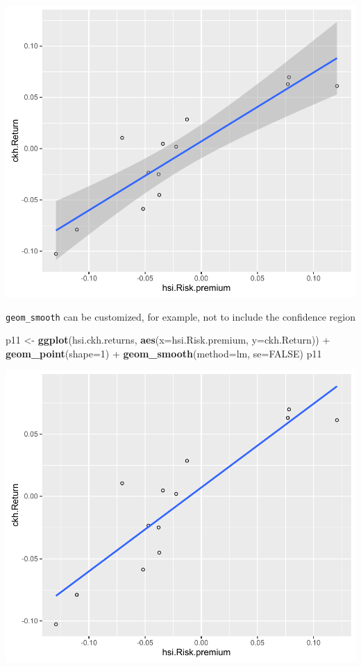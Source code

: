 \documentclass[]{article}
\newenvironment{Shaded}{\begin{snugshade}}{\end{snugshade}}
\newcommand{\KeywordTok}[1]{\textcolor[rgb]{0.13,0.29,0.53}{\textbf{{#1}}}}
\newcommand{\DataTypeTok}[1]{\textcolor[rgb]{0.13,0.29,0.53}{{#1}}}
\newcommand{\DecValTok}[1]{\textcolor[rgb]{0.00,0.00,0.81}{{#1}}}
\newcommand{\StringTok}[1]{\textcolor[rgb]{0.31,0.60,0.02}{{#1}}}
\newcommand{\OtherTok}[1]{\textcolor[rgb]{0.56,0.35,0.01}{{#1}}}
\newcommand{\NormalTok}[1]{{#1}}
\begin{document}
\begin{center}\includegraphics{11_Linear_Regression_Plot_pdf/lr_6-1} \end{center}

\texttt{geom\_smooth} can be customized, for example, not to include the
confidence region

\begin{Shaded}
\begin{Highlighting}[]
\NormalTok{p11 <-}\StringTok{ }\KeywordTok{ggplot}\NormalTok{(hsi.ckh.returns, }\KeywordTok{aes}\NormalTok{(}\DataTypeTok{x=}\NormalTok{hsi.Risk.premium, }\DataTypeTok{y=}\NormalTok{ckh.Return)) +}\StringTok{ }\KeywordTok{geom_point}\NormalTok{(}\DataTypeTok{shape=}\DecValTok{1}\NormalTok{) +}\StringTok{ }\KeywordTok{geom_smooth}\NormalTok{(}\DataTypeTok{method=}\NormalTok{lm, }\DataTypeTok{se=}\OtherTok{FALSE}\NormalTok{) }
\NormalTok{p11}
\end{Highlighting}
\end{Shaded}

\begin{center}\includegraphics{11_Linear_Regression_Plot_pdf/lr_7-1} \end{center}
\end{document}
